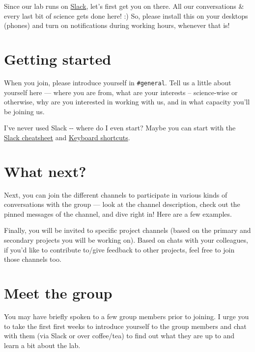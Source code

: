 \documentclass[
  letterpaper,
  DIV=11,
  numbers=noendperiod]{scrreprt}
\begin{document}
Since our lab runs on \href{https://jravilab.slack.com}{Slack}, let's
first get you on there. All our conversations \& every last bit of
science gets done here! :) So, please install this on your desktops
(phones) and turn on notifications during working hours, whenever that
is!

\hypertarget{getting-started}{%
\section{Getting started}\label{getting-started}}

When you join, please introduce yourself in \texttt{\#general}. Tell us
a little about yourself here --- where you are from, what are your
interests -- science-wise or otherwise, why are you interested in
working with us, and in what capacity you'll be joining us.

I've never used Slack -\/- where do I even start? Maybe you can start
with the
\href{https://github.com/JRaviLab/cheatsheets/blob/master/slack-misc/slack-cheatsheet.pdf}{Slack
cheatsheet} and
\href{https://slack.com/help/articles/201374536-Slack-keyboard-shortcuts}{Keyboard
shortcuts}.

\hypertarget{what-next}{%
\section{What next?}\label{what-next}}

Next, you can join the different channels to participate in various
kinds of conversations with the group --- look at the channel
description, check out the pinned messages of the channel, and dive
right in! Here are a few examples.

Finally, you will be invited to specific project channels (based on the
primary and secondary projects you will be working on). Based on chats
with your colleagues, if you'd like to contribute to/give feedback to
other projects, feel free to join those channels too.

\hypertarget{meet-the-group}{%
\section{Meet the group}\label{meet-the-group}}

You may have briefly spoken to a few group members prior to joining. I
urge you to take the first first weeks to introduce yourself to the
group members and chat with them (via Slack or over coffee/tea) to find
out what they are up to and learn a bit about the lab.
\end{document}
